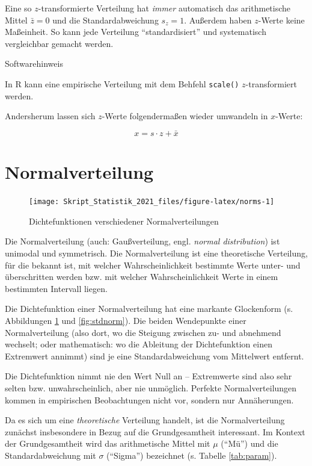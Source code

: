 \documentclass[
  11pt,
  ngerman,
  a4paper,
]{report}
\begin{document}
Eine so \(z\)-transformierte Verteilung hat \emph{immer} automatisch das arithmetische Mittel \(\bar{z}=0\) und die Standardabweichung \(s_z=1\). Außerdem haben \(z\)-Werte keine Maßeinheit. So kann jede Verteilung \enquote{standardisiert} und systematisch vergleichbar gemacht werden.

Softwarehinweis

In R kann eine empirische Verteilung mit dem Behfehl \texttt{scale()} \(z\)-transformiert werden.

Andersherum lassen sich \(z\)-Werte folgendermaßen wieder umwandeln in \(x\)-Werte:

\[
  x=s\cdot z+\bar{x}
  \label{eq:zrev}
\]

\hypertarget{normalverteilung}{%
\section{Normalverteilung}\label{normalverteilung}}

\begin{figure}[b]

{\centering \texttt{[image: Skript\_Statistik\_2021\_files/figure-latex/norms-1]} 

}

\caption{Dichtefunktionen verschiedener Normalverteilungen}\label{fig:norms}
\end{figure}

Die Normalverteilung (auch: Gaußverteilung, engl. \emph{normal distribution}) ist unimodal und symmetrisch. Die Normalverteilung ist eine theoretische Verteilung, für die bekannt ist, mit welcher Wahrscheinlichkeit bestimmte Werte unter- und überschritten werden bzw. mit welcher Wahrscheinlichkeit Werte in einem bestimmten Intervall liegen.

Die Dichtefunktion einer Normalverteilung hat eine markante Glockenform (s. Abbildungen \ref{fig:norms} und \ref{fig:stdnorm}). Die beiden Wendepunkte einer Normalverteilung (also dort, wo die Steigung zwischen zu- und abnehmend wechselt; oder mathematisch: wo die Ableitung der Dichtefunktion einen Extremwert annimmt) sind je eine Standardabweichung vom Mittelwert entfernt.

Die Dichtefunktion nimmt nie den Wert Null an -- Extremwerte sind also sehr selten bzw. unwahrscheinlich, aber nie unmöglich. Perfekte Normalverteilungen kommen in empirischen Beobachtungen nicht vor, sondern nur Annäherungen.

Da es sich um eine \emph{theoretische} Verteilung handelt, ist die Normalverteilung zunächst insbesondere in Bezug auf die Grundgesamtheit interessant. Im Kontext der Grundgesamtheit wird das arithmetische Mittel mit \(\mu\) (\enquote{Mü}) und die Standardabweichung mit \(\sigma\) (\enquote{Sigma}) bezeichnet (s. Tabelle \ref{tab:param}).
\end{document}
